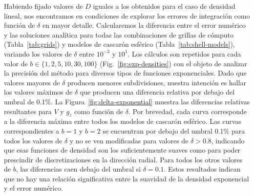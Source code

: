 Habiendo fijado valores de $D$ iguales a los obtenidos para el caso de
densidad lineal, nos encontramos en condiciones de explorar los errores de
integración como función de $\delta$ en mayor detalle.
Calcularemos la diferencia entre el error numérico y las soluciones analítica
para todas las combinaciones de grillas de cómputo (Tabla~\ref{tab:grids})
y modelos de cascarón esférico (Tabla~\ref{tab:shell-models}),
variando los valores de $\delta$ entre $10^{-3}$ y $10^{1}$.
Los cálculos son repetidos para cada valor de $b \in \{1, 2, 5, 10, 30, 100\}$
(Fig.~\ref{fig:exp-densities}) con el objeto de analizar la precisión del
método para diversos tipos de funciones exponenciales.
Dado que valores mayores de $\delta$ producen menores subdivisiones, nuestra
intención es hallar los valores máximos de $\delta$ que producen una diferencia
relativa por debajo del umbral de 0.1\%.
La Figura~\ref{fig:delta-exponential} muestra las diferencias relativas
resultantes para $V$ y $g_z$ como función de $\delta$.
Por brevedad, cada curva corresponde a la diferencia máxima entre todos los
modelos de cascarón esférico.
Las curvas correspondientes a $b=1$ y $b=2$ se encuentran por debajo del umbral
0.1\% para todos los valores de $\delta$ y no se ven modificadas para valores
de $\delta > 0.8$, indicando que esas funciones de densidad son los
suficientemente suaves como para poder prescindir de discretizaciones en la
dirección radial.
Para todos los otros valores de $b$, las diferencias caen debajo del umbral si
$\delta=0.1$.
Estos resultados indican que no hay una relación significativa entre la
suavidad de la densidad exponencial y el error numérico.


